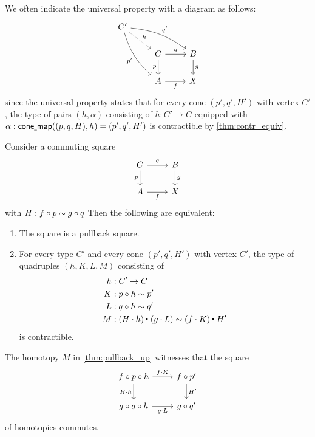 We often indicate the universal property with a diagram as follows:
\begin{equation*}
\begin{tikzcd}
C' \arrow[drr,bend left=15,"{q'}"] \arrow[dr,densely dotted,"h"] \arrow[ddr,bend right=15,swap,"{p'}"] \\
& C \arrow[r,"q"] \arrow[d,swap,"p"] & B \arrow[d,"g"] \\
& A \arrow[r,swap,"f"] & X
\end{tikzcd}
\end{equation*}
since the universal property states that for every cone $(p',q',H')$ with vertex $C'$, the type of pairs $(h,\alpha)$ consisting of $h:C'\to C$ equipped with $\alpha:\mathsf{cone\underline{\ }{}map}((p,q,H),h)=(p',q',H')$ is contractible by \cref{thm:contr_equiv}.


\begin{prp}\label{thm:pullback_up}
Consider a commuting square
\begin{equation*}
\begin{tikzcd}
C \arrow[r,"q"] \arrow[d,swap,"p"] & B \arrow[d,"g"] \\
A \arrow[r,swap,"f"] & X
\end{tikzcd}
\end{equation*}
with $H:f\circ p\sim g\circ q$
Then the following are equivalent:
\begin{enumerate}
\item The square is a pullback square.
\item For every type $C'$ and every cone $(p',q',H')$ with vertex $C'$, the type of quadruples $(h,K,L,M)$ consisting of
\begin{align*}
h & : C'\to C \\
K & : p\circ h \htpy p' \\
L & : q\circ h \htpy q' \\
M & : \ct{(H\cdot h)}{(g\cdot L)} \htpy \ct{(f\cdot K)}{H'}
\end{align*}
is contractible.
\end{enumerate}
\end{prp}

\begin{rmk}
The homotopy $M$ in \cref{thm:pullback_up} witnesses that the square
\begin{equation*}
\begin{tikzcd}
f\circ p\circ h \arrow[r,"f\cdot K"] \arrow[d,swap,"H\cdot h"] & f\circ p' \arrow[d,"{H'}"] \\
g\circ q\circ h \arrow[r,swap,"g\cdot L"] & g\circ q'
\end{tikzcd}
\end{equation*}
of homotopies commutes.
\end{rmk}

